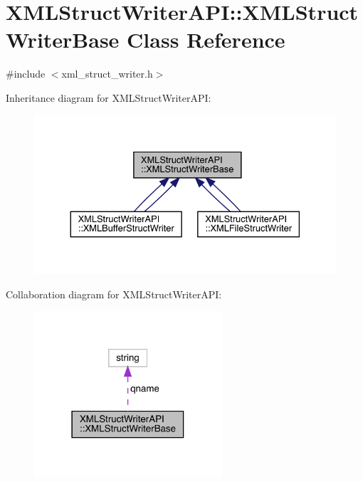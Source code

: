 \hypertarget{classXMLStructWriterAPI_1_1XMLStructWriterBase}{}\section{X\+M\+L\+Struct\+Writer\+A\+PI\+:\+:X\+M\+L\+Struct\+Writer\+Base Class Reference}
\label{classXMLStructWriterAPI_1_1XMLStructWriterBase}


{\ttfamily \#include $<$xml\+\_\+struct\+\_\+writer.\+h$>$}



Inheritance diagram for X\+M\+L\+Struct\+Writer\+A\+PI\+:\nopagebreak
\begin{figure}[H]
\begin{center}
\leavevmode
\includegraphics[width=330pt]{d6/dc3/classXMLStructWriterAPI_1_1XMLStructWriterBase__inherit__graph}
\end{center}
\end{figure}


Collaboration diagram for X\+M\+L\+Struct\+Writer\+A\+PI\+:\nopagebreak
\begin{figure}[H]
\begin{center}
\leavevmode
\includegraphics[width=198pt]{df/dcd/classXMLStructWriterAPI_1_1XMLStructWriterBase__coll__graph}
\end{center}
\end{figure}
